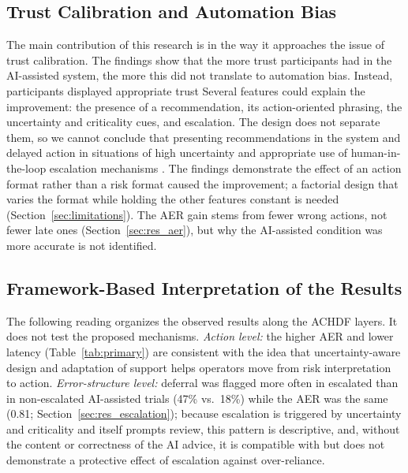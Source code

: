 \documentclass[journal]{IEEEtran}
\theoremstyle{plain}
\theoremstyle{definition}
\providecommand{\DIFaddtex}[1]{{\protect\color{blue} \sf #1}} %
\providecommand{\DIFdeltex}[1]{{\protect\color{red} \scriptsize #1}} %
\providecommand{\DIFaddbegin}{} %
\providecommand{\DIFaddend}{} %
\providecommand{\DIFdelbegin}{} %
\providecommand{\DIFdelend}{} %
\providecommand{\DIFadd}[1]{\texorpdfstring{\DIFaddtex{#1}}{#1}} %
\providecommand{\DIFdel}[1]{\texorpdfstring{\DIFdeltex{#1}}{}} %
\newcommand{\DIFscaledelfig}{0.5}
\newlength{\DIFdelgraphicswidth} %
\newlength{\DIFdelgraphicsheight} %
\newcommand{\DIFaddincludegraphics}[2][]{{\color{blue}\fbox{\DIFOincludegraphics[#1]{#2}}}} %
\newcommand{\DIFdelincludegraphics}[2][]{%
\sbox{\DIFdelgraphicsbox}{\DIFOincludegraphics[#1]{#2}}%
\settoboxwidth{\DIFdelgraphicswidth}{\DIFdelgraphicsbox} %
\settoboxtotalheight{\DIFdelgraphicsheight}{\DIFdelgraphicsbox} %
\scalebox{\DIFscaledelfig}{%
\parbox[b]{\DIFdelgraphicswidth}{\usebox{\DIFdelgraphicsbox}\\[-\baselineskip] \rule{\DIFdelgraphicswidth}{0em}}\llap{\resizebox{\DIFdelgraphicswidth}{\DIFdelgraphicsheight}{%
\setlength{\unitlength}{\DIFdelgraphicswidth}%
\begin{picture}(1,1)%
\thicklines\linethickness{2pt} %
{\color[rgb]{1,0,0}\put(0,0){\framebox(1,1){}}}%
{\color[rgb]{1,0,0}\put(0,0){\line( 1,1){1}}}%
{\color[rgb]{1,0,0}\put(0,1){\line(1,-1){1}}}%
\end{picture}%
}\hspace*{3pt}}} %
} %
\DeclareRobustCommand{\DIFaddbegin}{\DIFOaddbegin \let\includegraphics\DIFaddincludegraphics} %
\DeclareRobustCommand{\DIFaddend}{\DIFOaddend \let\includegraphics\DIFOincludegraphics} %
\DeclareRobustCommand{\DIFdelbegin}{\DIFOdelbegin \let\includegraphics\DIFdelincludegraphics} %
\DeclareRobustCommand{\DIFdelend}{\DIFOaddend \let\includegraphics\DIFOincludegraphics} %
\begin{document}
\DIFdelbegin \subsection{\DIFdel{Trust Calibration and Automation Bias}}
\addtocounter{subsection}{-1}%
\DIFdel{The main contribution of this research is in the way it approaches the issue of trust calibration. The findings show that the more trust participants had in the AI-assisted system, the more this did not translate to automation bias. Instead, participants displayed appropriate trust }\DIFdelend \DIFaddbegin \DIFadd{Several features could explain the improvement: the presence of a recommendation, its action-oriented phrasing, the uncertainty and criticality cues, and escalation. The design does not separate them, so we cannot conclude that presenting recommendations }\DIFaddend in \DIFdelbegin \DIFdel{the system and delayed action in situations of high uncertainty and appropriate use of human-in-the-loop escalation mechanisms \cite{Raji2019AIES,Raji2022CACM,Weidinger2022FAccT}. The findings demonstrate the effect of }\DIFdelend \DIFaddbegin \DIFadd{an action format rather than a risk format caused the improvement; a factorial design that varies the format while holding the other features constant is needed (Section~\ref{sec:limitations}). The AER gain stems from fewer wrong actions, not fewer late ones (Section~\ref{sec:res_aer}), but why the AI-assisted condition was more accurate is not identified.
}

\subsection{\DIFadd{Framework-Based Interpretation of the Results}}
\label{sec:interpretation}
\DIFadd{The following reading organizes the observed results along the ACHDF layers. It does not test the proposed mechanisms. \emph{Action level:} the higher AER and lower latency (Table~\ref{tab:primary}) are consistent with the idea that }\DIFaddend uncertainty-aware \DIFdelbegin \DIFdel{design and }\DIFdelend \DIFaddbegin \DIFadd{adaptation of support helps operators move from risk interpretation to action. \emph{Error-structure level:} deferral was flagged more often in escalated than in non-escalated AI-assisted trials (47\% vs.\ 18\%) while the AER was the same (0.81; Section~\ref{sec:res_escalation}); because escalation is triggered by uncertainty and criticality and itself prompts review, this pattern is descriptive, and, without the content or correctness of the AI advice, it is compatible with but does not demonstrate a protective effect of escalation against over-reliance.
}
\end{document}

